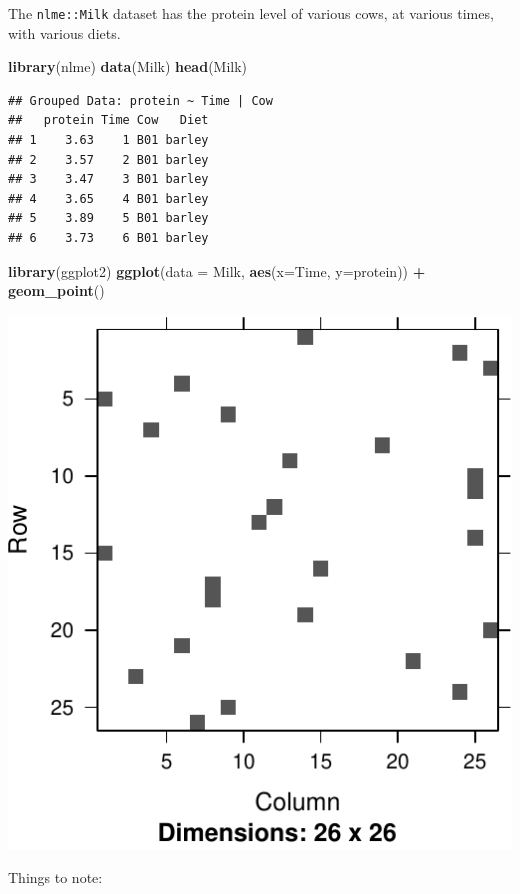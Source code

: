 \documentclass[]{book}
\newenvironment{Shaded}{\begin{snugshade}}{\end{snugshade}}
\newcommand{\DataTypeTok}[1]{\textcolor[rgb]{0.13,0.29,0.53}{#1}}
\newcommand{\KeywordTok}[1]{\textcolor[rgb]{0.13,0.29,0.53}{\textbf{#1}}}
\newcommand{\NormalTok}[1]{#1}
\newcommand{\OperatorTok}[1]{\textcolor[rgb]{0.81,0.36,0.00}{\textbf{#1}}}
\newcommand{\StringTok}[1]{\textcolor[rgb]{0.31,0.60,0.02}{#1}}
\theoremstyle{definition}
\theoremstyle{definition}
\theoremstyle{definition}
\theoremstyle{remark}
\begin{document}
The \texttt{nlme::Milk} dataset has the protein level of various cows, at various times, with various diets.

\begin{Shaded}
\begin{Highlighting}[]
\KeywordTok{library}\NormalTok{(nlme)}
\KeywordTok{data}\NormalTok{(Milk)}
\KeywordTok{head}\NormalTok{(Milk)}
\end{Highlighting}
\end{Shaded}

\begin{verbatim}
## Grouped Data: protein ~ Time | Cow
##   protein Time Cow   Diet
## 1    3.63    1 B01 barley
## 2    3.57    2 B01 barley
## 3    3.47    3 B01 barley
## 4    3.65    4 B01 barley
## 5    3.89    5 B01 barley
## 6    3.73    6 B01 barley
\end{verbatim}

\begin{Shaded}
\begin{Highlighting}[]
\KeywordTok{library}\NormalTok{(ggplot2)}
\KeywordTok{ggplot}\NormalTok{(}\DataTypeTok{data =}\NormalTok{ Milk, }\KeywordTok{aes}\NormalTok{(}\DataTypeTok{x=}\NormalTok{Time, }\DataTypeTok{y=}\NormalTok{protein)) }\OperatorTok{+}
\StringTok{  }\KeywordTok{geom_point}\NormalTok{()}
\end{Highlighting}
\end{Shaded}

\includegraphics[width=0.5\linewidth]{Rcourse_files/figure-latex/unnamed-chunk-274-1}

Things to note:
\end{document}
